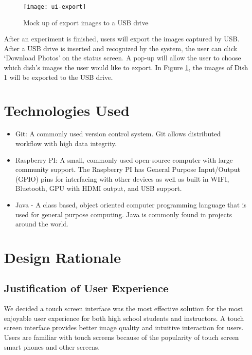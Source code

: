 \begin{figure}[H]
\texttt{[image: ui-export]}
\caption{\label{figure:ui-export} Mock up of export images to a USB drive}
\end{figure}

After an experiment is finished, users will export the images captured by USB. After a USB drive is inserted and recognized by the system, the user can click `Download Photos' on the status screen. A pop-up will allow the user to choose which dish's images the user would like to export. In Figure \ref{figure:ui-export}, the images of Dish 1 will be exported to the USB drive.




\section{Technologies Used}
	\begin{itemize}
	\item Git: A commonly used version control system. Git allows distributed workflow with high data integrity.
	\item Raspberry PI: A small, commonly used open-source computer with large community support. The Raspberry PI has General Purpose Input/Output (GPIO) pins for interfacing with other devices as well as built in WIFI, Bluetooth, GPU with HDMI output, and USB support.
	\item Java - A class based, object oriented computer programming language that is used for general purpose computing. Java is commonly found in projects around the world.
	\end{itemize}


\section{Design Rationale}
\subsection{Justification of User Experience}

We decided a touch screen interface was the most effective solution for the most enjoyable user experience for both high school students and instructors. A touch screen interface provides better image quality and intuitive interaction for users. Users are familiar with touch screens because of the popularity of touch screen smart phones and other screens.

